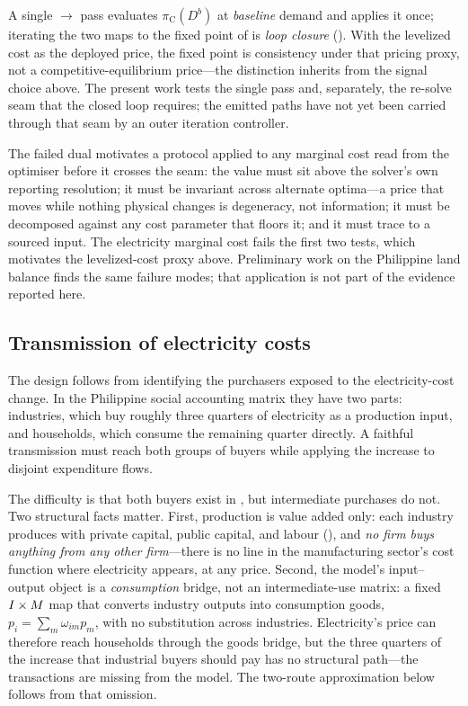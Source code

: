 \noindent A single \CLEWS{}$\to$\OGCore{} pass evaluates $\pi_{\text{C}}(D^{b})$ at
\emph{baseline} demand and applies it once; iterating the two maps to the fixed point
of  is \emph{loop closure} (). With the
levelized cost as the deployed price, the fixed point is consistency under that
pricing proxy, not a competitive-equilibrium price---the distinction inherits from
the signal choice above. The
present work tests the single pass and, separately, the \CLEWS{} re-solve seam that the
closed loop requires; the emitted paths have not yet been carried through that seam by an
outer iteration controller.

\begin{remark}
\label{rem:hygiene}
The failed dual motivates a protocol applied to any marginal cost read from the optimiser
before it crosses the seam: the value must sit above the solver's own reporting
resolution; it must be invariant across alternate optima---a price that moves while
nothing physical changes is degeneracy, not information; it must be decomposed
against any cost parameter that floors it; and it must trace to a sourced input.
The electricity marginal cost fails the first two tests, which motivates the
levelized-cost proxy above. Preliminary work on the Philippine land balance finds the
same failure modes; that application is not part of the evidence reported here.
\end{remark}

\subsection{Transmission of electricity costs}
\label{sec:routes}

The design follows from identifying the purchasers exposed to the electricity-cost
change. In the Philippine social accounting matrix they have two parts: industries,
which buy roughly three quarters of electricity as a production input, and households,
which consume the remaining quarter directly. A faithful transmission must reach both
groups of buyers while applying the increase to disjoint expenditure flows.

The difficulty is that both buyers exist in \OGCore{}, but intermediate purchases do
not. Two structural facts matter. First, production is value added only: each industry
produces with private capital, public capital, and labour (), and
\emph{no firm buys anything from any other firm}---there is no line in the
manufacturing sector's cost function where electricity appears, at any price. Second,
the model's input--output object is a \emph{consumption} bridge, not an
intermediate-use matrix: a fixed $I\times M$ map that converts industry
outputs into consumption goods, $p_i=\sum_m \omega_{im}p_m$, with no substitution
across industries. Electricity's price can therefore reach households through the
goods bridge, but the three quarters of the increase that industrial buyers should
pay has no structural path---the transactions are missing from the model. The two-route
approximation below follows from that omission.

